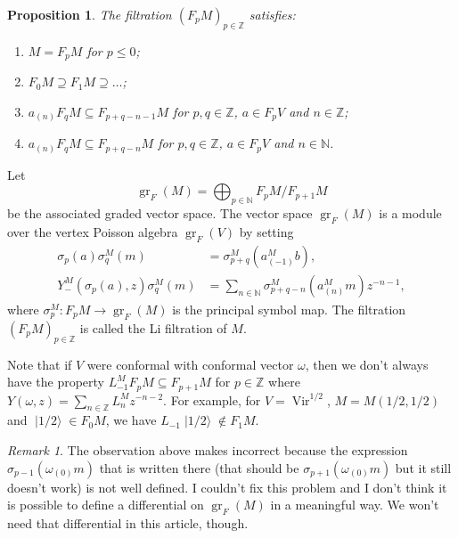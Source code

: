 \documentclass[a4paper, 12pt, reqno]{amsart}
\newtheorem{proposition}[theorem]{Proposition}
\theoremstyle{remark}
\newtheorem{remark}[theorem]{Remark}
\DeclareMathOperator{\Vir}{Vir}
\DeclareMathOperator{\gr}{gr}
\DeclareMathOperator{\vachalf}{|1/2\rangle}
\begin{document}
\begin{proposition}
  \label{prp:4}
  The filtration $(F_pM)_{p \in \mathbb{Z}}$ satisfies:
  \begin{enumerate}
  \item $M = F_pM$ for $p \le 0$;
  \item $F_0M \supseteq F_1M \supseteq \dots$;
  \item $a_{(n)}F_qM \subseteq F_{p + q - n - 1}M$ for $p, q \in \mathbb{Z}$, $a \in F_pV$ and $n \in \mathbb{Z}$;
  \item $a_{(n)}F_qM \subseteq F_{p + q - n}M$ for $p, q \in \mathbb{Z}$, $a \in F_pV$ and $n \in \mathbb{N}$.
  \end{enumerate}
\end{proposition}

Let
\begin{equation*}
  \gr_F(M) = \bigoplus_{p \in \mathbb{N}}F_pM/F_{p + 1}M
\end{equation*}
be the associated graded vector space.
The vector space $\gr_F(M)$ is a module over the vertex Poisson algebra $\gr_F(V)$ by setting
\begin{align*}
  \sigma_p(a)\sigma^M_q(m) &= \sigma^M_{p + q}(a^M_{(-1)}b), \\
  Y^M_-(\sigma_p(a), z)\sigma^M_q(m) &= \sum_{n \in \mathbb{N}}\sigma^M_{p + q - n}(a^M_{(n)}m)z^{-n - 1},
\end{align*}
where $\sigma^M_p: F_pM \to \gr_F(M)$ is the principal symbol map.
The filtration $(F_pM)_{p \in \mathbb{Z}}$ is called the Li filtration of $M$.

Note that if $V$ were conformal with conformal vector $\omega$, then we don't always have the property $L_{-1}^MF_pM \subseteq F_{p + 1}M$ for $p \in \mathbb{Z}$ where $Y(\omega, z) = \sum_{n \in \mathbb{Z}}L^M_nz^{-n - 2}$.
For example, for $V = \Vir^{1/2}$, $M = M(1/2, 1/2)$ and $\vachalf \in F_0M$, we have $L_{-1}\vachalf \notin F_1M$.

\begin{remark}
  \label{rmk:2}
  The observation above makes \cite[Lemma 3.1.2]{arakawa_remark_2012} incorrect because the expression $\sigma_{p - 1}(\omega_{(0)}m)$ that is written there (that should be $\sigma_{p + 1}(\omega_{(0)}m)$ but it still doesn't work) is not well defined.
  I couldn't fix this problem and I don't think it is possible to define a differential on $\gr_F(M)$ in a meaningful way.
  We won't need that differential in this article, though.
\end{remark}
\end{document}

